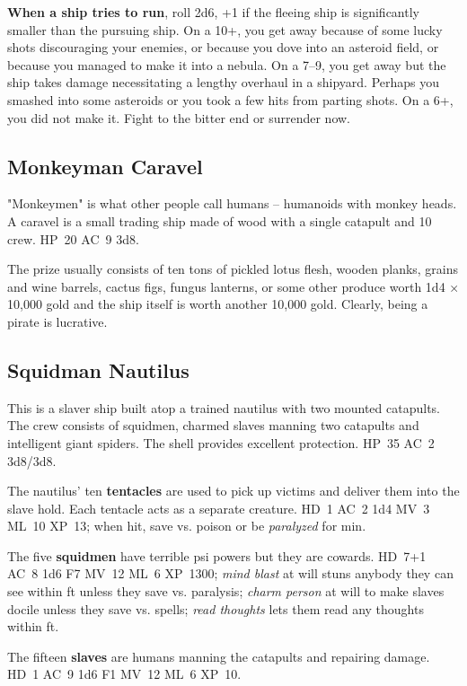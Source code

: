 \documentclass[11pt]{bxart}
\begin{document}
\textbf{When a ship tries to run}, roll 2d6, +1 if the fleeing ship is
significantly smaller than the pursuing ship. On a 10+, you get away
because of some lucky shots discouraging your enemies, or because you
dove into an asteroid field, or because you managed to make it into a
nebula. On a 7--9, you get away but the ship takes damage
necessitating a lengthy overhaul in a shipyard. Perhaps you smashed
into some asteroids or you took a few hits from parting shots. On a
6+, you did not make it. Fight to the bitter end or surrender now.

\subsection{Monkeyman Caravel}

"Monkeymen" is what other people call humans – humanoids with monkey
heads. A caravel is a small trading ship made of wood with a single
catapult and 10 crew. HP~20 AC~9 3d8.

The prize usually consists of ten tons of pickled lotus flesh, wooden
planks, grains and wine barrels, cactus figs, fungus lanterns, or some
other produce worth 1d4 × 10,000 gold and the ship itself is worth
another 10,000 gold. Clearly, being a pirate is lucrative.

\subsection{Squidman Nautilus}

This is a slaver ship built atop a trained nautilus with two mounted
catapults. The crew consists of squidmen, charmed slaves manning two
catapults and intelligent giant spiders. The shell provides excellent
protection. HP~35 AC~2 3d8/3d8.

The nautilus' ten \textbf{tentacles} are used to pick up victims and
deliver them into the slave hold. Each tentacle acts as a separate
creature. HD~1 AC~2 1d4 MV~3 ML~10 XP~13; when hit, save vs. poison or
be \textit{paralyzed} for \unit[10]{min}.

The five \textbf{squidmen} have terrible psi powers but they are
cowards. HD~7+1 AC~8 1d6 F7 MV~12 ML~6 XP~1300; \textit{mind blast} at
will stuns anybody they can see within \unit[60]{ft} unless they save
vs. paralysis; \textit{charm person} at will to make slaves docile
unless they save vs. spells; \textit{read thoughts} lets them read any
thoughts within \unit[60]{ft}.

The fifteen \textbf{slaves} are humans manning the catapults and
repairing damage. HD~1 AC~9 1d6 F1 MV~12 ML~6 XP~10.
\end{document}
